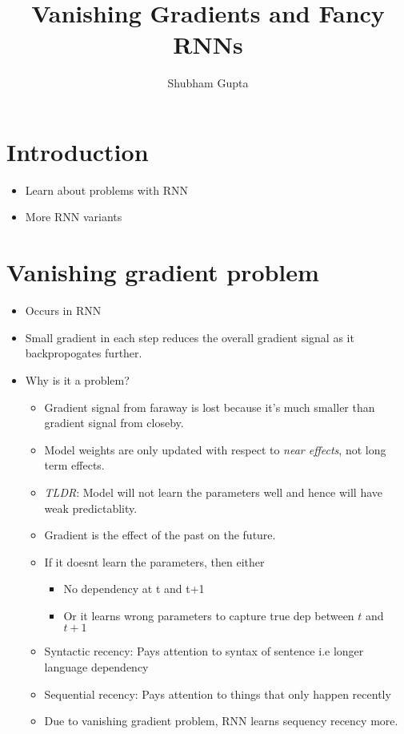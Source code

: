 \documentclass[a4paper]{article}
\title{Vanishing Gradients and Fancy RNNs}
\author{Shubham Gupta}
\begin{document}
\maketitle
\section{Introduction}
\begin{itemize}
    \item Learn about problems with RNN
    \item More RNN variants
\end{itemize}

\section{Vanishing gradient problem}
\begin{itemize}
    \item Occurs in RNN
    \item Small gradient in each step reduces the overall gradient signal as it backpropogates further.
    \item Why is it a problem?
    \begin{itemize}
        \item Gradient signal from faraway is lost because it's much smaller than gradient signal from closeby.
        \item Model weights are only updated with respect to \textit{near effects}, not long term effects.
        \item \textit{TLDR}: Model will not learn the parameters well and hence will have weak predictablity.
        \item Gradient is the effect of the past on the future.
        \item If it doesnt learn the parameters, then either
        \begin{itemize}
            \item No dependency at t and t+1
            \item Or it learns wrong parameters to capture true dep between $t$ and $t+1$
        \end{itemize}
        \item Syntactic recency: Pays attention to syntax of sentence i.e longer language dependency
        \item Sequential recency: Pays attention to things that only happen recently
        \item Due to vanishing gradient problem, RNN learns sequency recency more.
    \end{itemize}
\end{itemize}
\end{document}
